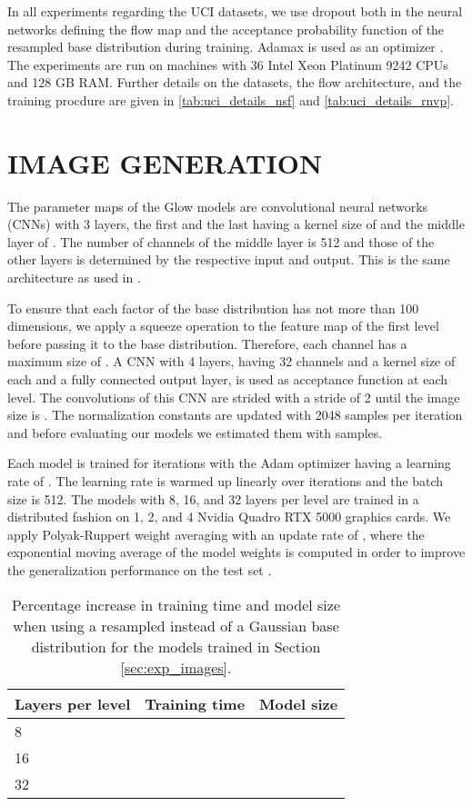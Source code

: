 \documentclass[twoside]{article}
\begin{document}
In all experiments regarding the UCI datasets, we use dropout both in the neural networks defining the flow map and the acceptance probability function  of the resampled base distribution during training. Adamax is used as an optimizer \citep{Kingma2015}. The experiments are run on machines with 36 Intel Xeon Platinum 9242 CPUs and 128 GB RAM. Further details on the datasets, the flow architecture, and the training procdure are given in \autoref{tab:uci_details_nsf} and \autoref{tab:uci_details_rnvp}.


\section{IMAGE GENERATION}
\label{sec:app_image_generation}

The parameter maps of the Glow models are convolutional neural networks (CNNs) with 3 layers, the first and the last having a kernel size of  and the middle layer of . The number of channels of the middle layer is 512 and those of the other layers is determined by the respective input and output. This is the same architecture as used in \citep{Kingma2018}.

To ensure that each factor of the base distribution has not more than 100 dimensions, we apply a squeeze operation to the feature map of the first level before passing it to the base distribution. Therefore, each channel has a maximum size of . A CNN with 4 layers, having 32 channels and a kernel size of  each and a fully connected output layer, is used as acceptance function at each level. The convolutions of this CNN are strided with a stride of 2 until the image size is . The normalization constants are updated with 2048 samples per iteration and before evaluating our models we estimated them with  samples.

Each model is trained for  iterations with the Adam optimizer having a learning rate of . The learning rate is warmed up linearly over  iterations and the batch size is 512. The models with 8, 16, and 32 layers per level are trained in a distributed fashion on 1, 2, and 4 Nvidia Quadro RTX 5000 graphics cards. We apply Polyak-Ruppert weight averaging \citep{Polyak1990,Ruppert1988} with an update rate of , where the exponential moving average of the model weights is computed in order to improve the generalization performance on the test set \citep{Izmailov2018}.

\begin{table}[h]
  \caption{Percentage increase in training time and model size when using a resampled instead of a Gaussian base distribution for the models trained in Section \ref{sec:exp_images}.}
  \label{tab:images_overhead}
  \centering
  \vspace{0.3cm}
  \begin{tabular}{l|ll}
    Layers per level & Training time & Model size\\
    \hline
    8 &  &  \\
    16 &  &  \\
    32 &  & 
  \end{tabular}
\end{table}
\end{document}
